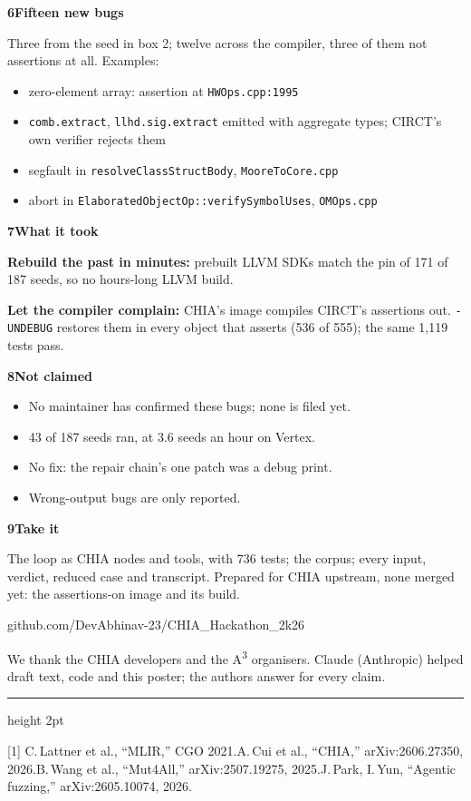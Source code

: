 \documentclass{article}
\newcommand{\body}{\fontsize{31}{41}\selectfont}
\renewcommand{\tiny}{\fontsize{24}{31}\selectfont}
\newcommand{\sect}[2]{\par{\fontsize{54}{62}\selectfont\bfseries\color{agB}#1\hspace{0.4em}\color{ink}#2\par}%
  \nointerlineskip\vspace{0.14in}{\color{agB}\hrule height 5pt}\vspace{0.02in}}
\newcommand{\code}[1]{\texttt{#1}}
\newenvironment{col}[1]{\begin{minipage}[t]{#1}\raggedright\body\setlength{\parskip}{0.22in}}{\end{minipage}}
\newcommand{\colW}{10.87in}
\newcommand{\rowgap}{\par\vspace{0.42in}}
\begin{document}
\begin{col}{\colW}
\sect{6}{Fifteen new bugs}
Three from the seed in box 2; twelve across the compiler, three of them not assertions at all. Examples:
\begin{itemize}
\item zero-element array: assertion at \code{HWOps.cpp:1995}
\item \code{comb.extract}, \code{llhd.sig.extract} emitted with aggregate types; CIRCT's own verifier rejects them
\item segfault in \code{resolveClassStructBody}, \code{MooreToCore.cpp}
\item abort in \code{ElaboratedObjectOp::\allowbreak verifySymbolUses}, \code{OMOps.cpp}
\end{itemize}
\end{col}

\rowgap
\begin{col}{\colW}
\sect{7}{What it took}
\textbf{Rebuild the past in minutes:} prebuilt LLVM SDKs match the pin of 171 of 187 seeds, so no hours-long LLVM build.

\textbf{Let the compiler complain:} CHIA's image compiles CIRCT's assertions out. \code{-UNDEBUG} restores them in every object that asserts (536 of 555); the same 1,119 tests pass.
\end{col}\hfill
\begin{col}{\colW}
\sect{8}{Not claimed}
\begin{itemize}
\item No maintainer has confirmed these bugs; none is filed yet.
\item 43 of 187 seeds ran, at 3.6 seeds an hour on Vertex.
\item No fix: the repair chain's one patch was a debug print.
\item Wrong-output bugs are only reported.
\end{itemize}
\end{col}\hfill
\begin{col}{\colW}
\sect{9}{Take it}
The loop as CHIA nodes and tools, with 736 tests; the corpus; every input, verdict, reduced case and transcript. Prepared for CHIA upstream, none merged yet: the assertions-on image and its build.

{\fontsize{25}{32}\selectfont\ttfamily github.com/DevAbhinav-23/CHIA\_Hackathon\_2k26\par}

{\tiny\color{mute}We thank the CHIA developers and the A\textsuperscript{3} organisers. Claude (Anthropic) helped draft text, code and this poster; the authors answer for every claim.\par}
\end{col}

\vfill
{\color{dsB}\hrule height 2pt}\vspace{0.2in}
{\tiny\color{mute}[1] C.\,Lattner et al., ``MLIR,'' CGO 2021.\quad [2] A.\,Cui et al., ``CHIA,'' arXiv:2606.27350, 2026.\quad [3] B.\,Wang et al., ``Mut4All,'' arXiv:2507.19275, 2025.\quad [4] J.\,Park, I.\,Yun, ``Agentic fuzzing,'' arXiv:2605.10074, 2026.\par}
\end{document}
